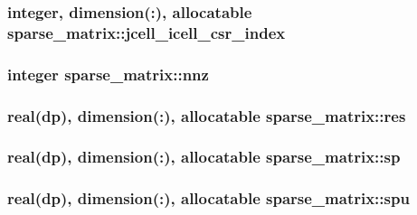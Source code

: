 \hypertarget{classsparse__matrix_ad984afee6f0ab8b2dbfcebfb10865373}{
\subsubsection[{jcell\-\_\-icell\-\_\-csr\-\_\-index}]{\setlength{\rightskip}{0pt plus 5cm}integer, dimension(\-:), allocatable sparse\-\_\-matrix\-::jcell\-\_\-icell\-\_\-csr\-\_\-index}}\label{classsparse__matrix_ad984afee6f0ab8b2dbfcebfb10865373}
\hypertarget{classsparse__matrix_ad6a2543199072d90691146df32537711}{
\subsubsection[{nnz}]{\setlength{\rightskip}{0pt plus 5cm}integer sparse\-\_\-matrix\-::nnz}}\label{classsparse__matrix_ad6a2543199072d90691146df32537711}
\hypertarget{classsparse__matrix_a49eac71f962298b72196fc162abc00af}{
\subsubsection[{res}]{\setlength{\rightskip}{0pt plus 5cm}real(dp), dimension(\-:), allocatable sparse\-\_\-matrix\-::res}}\label{classsparse__matrix_a49eac71f962298b72196fc162abc00af}
\hypertarget{classsparse__matrix_abb95d5c106775cd62ab9e83a686efdb9}{
\subsubsection[{sp}]{\setlength{\rightskip}{0pt plus 5cm}real(dp), dimension(\-:), allocatable sparse\-\_\-matrix\-::sp}}\label{classsparse__matrix_abb95d5c106775cd62ab9e83a686efdb9}
\hypertarget{classsparse__matrix_a93f5d23e4ca4f9de87aea445dbf661d7}{
\subsubsection[{spu}]{\setlength{\rightskip}{0pt plus 5cm}real(dp), dimension(\-:), allocatable sparse\-\_\-matrix\-::spu}}\label{classsparse__matrix_a93f5d23e4ca4f9de87aea445dbf661d7}
